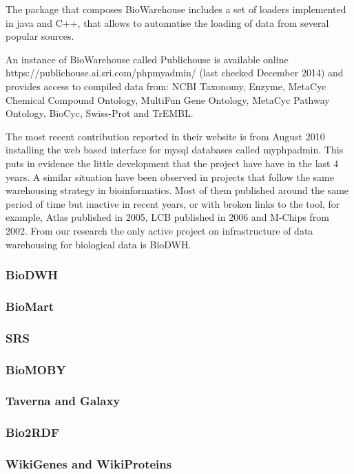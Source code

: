 The package that composes BioWarehouse includes a set of loaders implemented in java and C++, that allows to automatise the loading of data from several popular sources. 

An instance of BioWarehouse called Publichouse is available online https://publichouse.ai.sri.com/phpmyadmin/ (last checked December 2014) and provides access to compiled data from: NCBI Taxonomy, Enzyme, MetaCyc Chemical Compound Ontology, MultiFun Gene Ontology, MetaCyc Pathway Ontology, BioCyc, Swiss-Prot and TrEMBL.

The most recent contribution reported in their website is from August 2010 installing the web based interface for mysql databases called myphpadmin. This puts in evidence the little development that the project have have in the last 4 years. A similar situation have been observed in projects that follow the same warehousing strategy in bioinformatics. Most of them published around the same period of time but inactive in recent years, or with broken links to the tool, for example, Atlas \cite{SHA2005} published in 2005, LCB\cite{AME2006} published in 2006 and M-Chips \cite{FEL2002} from 2002. From our research the only active project on infrastructure of data warehousing for biological data is BioDWH.

\subsubsection{BioDWH}

\subsubsection{BioMart}
\subsubsection{SRS}
\subsubsection{BioMOBY}
\subsubsection{Taverna and Galaxy}
\subsubsection{Bio2RDF}
\subsubsection{WikiGenes and WikiProteins}

